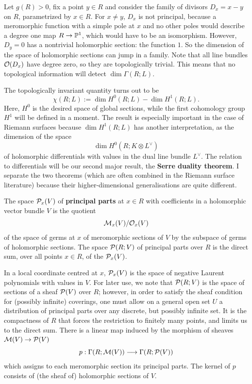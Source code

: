 \documentclass[12pt]{article}
\begin{document}
\begin{example}
Let $g(R)>0$, fix a point $y\in R$ and consider the family of divisors 
$D_x = x - y$ on $R$, parametrized by $x\in R$.  
For $x\neq y$, $D_x$ is not principal, because a meromorphic function 
with a simple pole at $x$ and no other poles would describe a degree one map 
$R\to\P^1$, which would have to be an isomorphism.  
However, $D_y = 0$ has a nontrivial holomorphic section: the function $1$.  
So the dimension of the space of holomorphic sections can jump in a family.  
Note that all line bundles $\cO(D_x)$ have degree zero, so they are 
topologically trivial.  
This means that no topological information will detect $\dim\Gamma(R;L)$.
\end{example}
The topologically invariant quantity turns out to be
\[
\chi(R;L) := \dim H^0(R;L) - \dim H^1(R;L).
\]
Here, $H^0$ is the desired space of global sections, while the first cohomology 
group $H^1$ will be defined in a moment.  
The result is especially important in the case of Riemann surfaces because 
$\dim H^1(R;L)$ has another interpretation, as the dimension of the space 
\[
\dim H^0(R;K\otimes L^\vee)
\]
of holomorphic differentials with values in the dual line bundle $L^\vee$. The relation to differentials will be our second major result, the \textbf{Serre duality theorem}.  
I separate the two theorems (which are often combined in the Riemann surface 
literature) because their higher-dimensional generalisations are quite 
different.

\begin{definition}
    The space $\cP_x(V)$ of \textbf{principal parts} at $x\in R$ with coefficients in a 
holomorphic vector bundle $V$ is the quotient 
\[
\cM_x(V)/\cO_x(V)
\]
of the space of germs at $x$ of meromorphic sections of $V$ by the subspace of 
germs of holomorphic sections.  
The space $\cP(R;V)$ of principal parts over $R$ is the direct sum, over all 
points $x\in R$, of the $\cP_x(V)$.
\end{definition}


In a local coordinate centred at $x$, $\cP_x(V)$ is the space of negative 
Laurent polynomials with values in $V$.  
For later use, we note that $\cP(R;V)$ is the space of sections of a sheaf 
$\cP(V)$ over $R$; however, in order to satisfy the sheaf condition for 
(possibly infinite) coverings, one must allow on a general open set $U$ a 
distribution of principal parts over any discrete, but possibly infinite set.  
It is the compactness of $R$ that forces the restriction to finitely many 
points, and limits us to the direct sum.  
There is a linear map induced by the morphism of sheaves $\cM(V) \to \cP(V)$
\[
p : \Gamma(R;\cM(V)) \longrightarrow \Gamma(R;\cP(V)) 
\]
which assigns to each meromorphic section its principal parts. The kernel of $p$ consists of (the sheaf of) holomorphic sections of $V$.    
\end{document}
